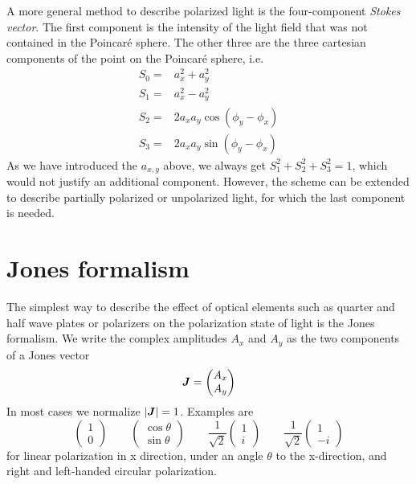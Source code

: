 A more general method to describe polarized light is the four-component \emph{Stokes vector}. The first component is the intensity of the light field that was not contained in the Poincaré sphere. The other three are the three cartesian components of the point on the Poincaré sphere, i.e.
\begin{align}
    S_0 = & a_x^2 + a_y^2 \\
    S_1 = & a_x^2 - a_y^2 \\
    S_2 = & 2 a_x  a_y \cos (\phi_y - \phi_x )\\
    S_3 = & 2 a_x  a_y \sin (\phi_y - \phi_x )
\end{align}
As we have introduced the $a_{x,y}$ above, we always get $S_1^2 + S_2^2 + S_3^2 = 1$, which would not justify an additional component. However, the scheme can be extended to describe partially polarized or unpolarized light, for which the last component is needed.



\section{Jones formalism}

The simplest way to describe the effect of optical elements such as quarter and half wave plates or polarizers on the polarization state of light is the Jones formalism. We write the complex amplitudes $A_x$ and $A_y$ as the two components of a Jones vector
\begin{equation}
    \boldsymbol{J} = \begin{pmatrix}
        A_x \\ A_y
    \end{pmatrix}
\end{equation}
In most cases we normalize $|\boldsymbol{J}| = 1$. Examples are 
\begin{equation}
    \begin{pmatrix}
       1 \\ 0
    \end{pmatrix} 
    \qquad 
      \begin{pmatrix}
        \cos \theta \\ \sin \theta
     \end{pmatrix}
     \qquad
     \frac{1}{\sqrt{2}}
     \begin{pmatrix}
        1 \\ i
     \end{pmatrix} 
     \qquad 
     \frac{1}{\sqrt{2}}
     \begin{pmatrix}
        1 \\ -i
     \end{pmatrix} 
\end{equation}
for linear polarization in x direction, under an angle $\theta$ to the x-direction, and right and left-handed circular polarization.


